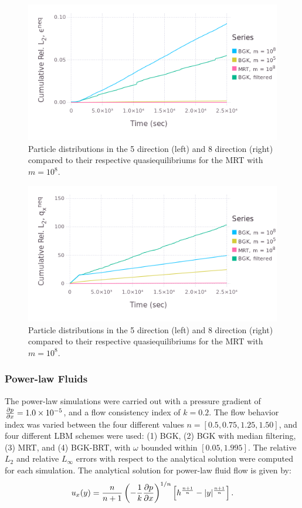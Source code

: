 \documentclass{article}
\begin{document}
\begin{figure}
    \includegraphics[width=\linewidth]{figs/poise-bingham/epsilon_cumulative}
    \caption{Particle distributions in the 5 direction (left) and 8 direction (right) compared to their respective quasiequilibriums for the MRT with $m = 10^8$.}
    \label{fig:epsilon-cumulative}
\end{figure}

\begin{figure}
    \includegraphics[width=\linewidth]{figs/poise-bingham/qx_cumulative}
    \caption{Particle distributions in the 5 direction (left) and 8 direction (right) compared to their respective quasiequilibriums for the MRT with $m = 10^8$.}
    \label{fig:qx-cumulative}
\end{figure}

\subsubsection{Power-law Fluids} \label{sec:poise-powerlaw}

The power-law simulations were carried out with a pressure gradient of $\frac{\partial p}{\partial x} = 1.0 \times 10^{-5}$, and a flow consistency index of $k = 0.2$.
The flow behavior index was varied between the four different values $n = [0.5, 0.75, 1.25, 1.50]$, and four different LBM schemes were used: (1) BGK, (2) BGK with median filtering, (3) MRT, and (4) BGK-BRT, with $\omega$ bounded within $[0.05, 1.995]$. 
The relative $L_2$ and relative $L_{\infty}$ errors with respect to the analytical solution were computed for each simulation.
The analytical solution for power-law fluid flow is given by:
\begin{equation} \label{eq:analytical-power-law}
  u_x(y) = \frac{n}{n+1}\left(-\frac{1}{k}\frac{\partial p}{\partial x}\right)^{1/n}\left[h^{\frac{n+1}{n}} - |y|^{\frac{n+1}{n}}\right].
\end{equation}
\end{document}
